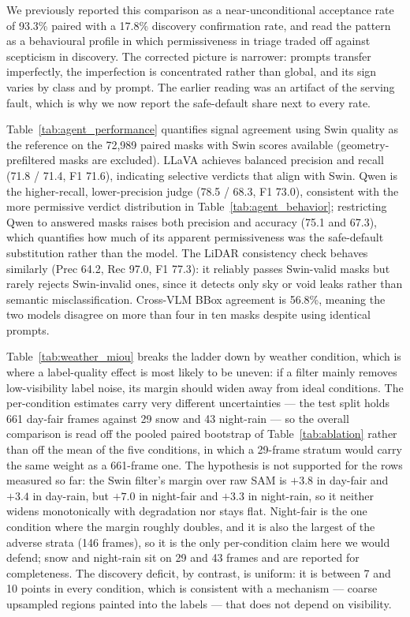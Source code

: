 \documentclass[conference]{IEEEtran}
\begin{document}
We previously reported this comparison as a near-unconditional acceptance rate of 93.3\% paired with a 17.8\% discovery confirmation rate, and read the pattern as a behavioural profile in which permissiveness in triage traded off against scepticism in discovery.
The corrected picture is narrower: prompts transfer imperfectly, the imperfection is concentrated rather than global, and its sign varies by class and by prompt.
The earlier reading was an artifact of the serving fault, which is why we now report the safe-default share next to every rate.




Table~\ref{tab:agent_performance} quantifies signal agreement using Swin quality as the reference on the 72{,}989 paired masks with Swin scores available (geometry-prefiltered masks are excluded).
LLaVA achieves balanced precision and recall (71.8 / 71.4, F1 71.6), indicating selective verdicts that align with Swin.
Qwen is the higher-recall, lower-precision judge (78.5 / 68.3, F1 73.0), consistent with the more permissive verdict distribution in Table~\ref{tab:agent_behavior}; restricting Qwen to answered masks raises both precision and accuracy (75.1 and 67.3), which quantifies how much of its apparent permissiveness was the safe-default substitution rather than the model.
The LiDAR consistency check behaves similarly (Prec 64.2, Rec 97.0, F1 77.3): it reliably passes Swin-valid masks but rarely rejects Swin-invalid ones, since it detects only sky or void leaks rather than semantic misclassification.
Cross-VLM BBox agreement is 56.8\%, meaning the two models disagree on more than four in ten masks despite using identical prompts.



Table~\ref{tab:weather_miou} breaks the ladder down by weather condition, which is where a
label-quality effect is most likely to be uneven: if a filter mainly removes low-visibility label
noise, its margin should widen away from ideal conditions.
The per-condition estimates carry very different uncertainties --- the test split holds 661 day-fair
frames against 29 snow and 43 night-rain --- so the overall comparison is read off the pooled paired
bootstrap of Table~\ref{tab:ablation} rather than off the mean of the five conditions, in which a
29-frame stratum would carry the same weight as a 661-frame one.
The hypothesis is not supported for the rows measured so far: the Swin filter's margin over raw SAM is
$+3.8$ in day-fair and $+3.4$ in day-rain, but $+7.0$ in night-fair and $+3.3$ in night-rain, so it
neither widens monotonically with degradation nor stays flat. Night-fair is the one condition where the
margin roughly doubles, and it is also the largest of the adverse strata (146 frames), so it is the
only per-condition claim here we would defend; snow and night-rain sit on 29 and 43 frames and are
reported for completeness. The discovery deficit, by contrast, is uniform: it is between 7 and 10
points in every condition, which is consistent with a mechanism --- coarse upsampled regions painted
into the labels --- that does not depend on visibility.
\end{document}

